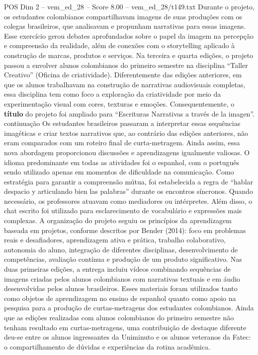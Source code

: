\begin{textsample}{POS Dim 2 – vem\_ed\_28 – Score 8.00 – vem\_ed\_28/t149.txt}
Durante o projeto, os estudantes colombianos compartilhavam imagens de suas produções com os colegas brasileiros, que analisavam e propunham narrativas para essas imagens.
Esse exercício gerou debates aprofundados sobre o papel da imagem na percepção e compreensão da realidade, além de conexões com o storytelling aplicado à construção de marcas, produtos e serviços.
Na terceira e quarta edições, o projeto passou a envolver alunos colombianos do primeiro semestre na disciplina “Taller Creativo” (Oficina de criatividade).
Diferentemente das edições anteriores, em que os alunos trabalhavam na construção de narrativas audiovisuais completas, essa disciplina tem como foco a exploração da criatividade por meio da experimentação visual com cores, texturas e emoções.
Consequentemente, o \textbf{título} do projeto foi ampliado para “Escrituras Narrativas a través de la imagen”. continuação Os estudantes brasileiros passaram a interpretar essas sequências imagéticas e criar textos narrativos que, ao contrário das edições anteriores, não eram comparados com um roteiro final de curta-metragem.
Ainda assim, essa nova abordagem proporcionou discussões e aprendizagens igualmente valiosas.
O idioma predominante em todas as atividades foi o espanhol, com o português sendo utilizado apenas em momentos de dificuldade na comunicação.
Como estratégia para garantir a compreensão mútua, foi estabelecida a regra de “hablar despacio y articulando bien las palabras” durante os encontros síncronos.
Quando necessário, os professores atuavam como mediadores ou intérpretes.
Além disso, o chat escrito foi utilizado para esclarecimento de vocabulário e expressões mais complexas.
A organização do projeto seguiu os princípios da aprendizagem baseada em projetos, conforme descritos por Bender (2014): foco em problemas reais e desafiadores, aprendizagem ativa e prática, trabalho colaborativo, autonomia do aluno, integração de diferentes disciplinas, desenvolvimento de competências, avaliação contínua e produção de um produto significativo.
Nas duas primeiras edições, a entrega incluiu vídeos combinando sequências de imagens criadas pelos alunos colombianos com narrativas textuais e em áudio desenvolvidas pelos alunos brasileiros.
Esses materiais foram utilizados tanto como objetos de aprendizagem no ensino de espanhol quanto como apoio na pesquisa para a produção de curtas-metragens dos estudantes colombianos.
Ainda que as edições realizadas com alunos colombianos do primeiro semestre não tenham resultado em curtas-metragens, uma contribuição de destaque diferente deu-se entre os alunos ingressantes da Uniminuto e os alunos veteranos da Fatec: o compartilhamento de dúvidas e experiências da rotina acadêmica.

\end{textsample}
